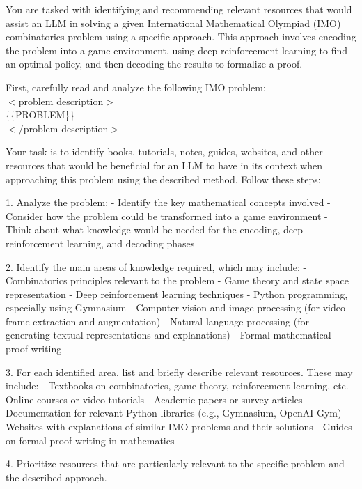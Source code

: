 {\begin{tcolorbox}[enhanced, breakable, rounded corners, 
    colback=brown!5!white, colframe=brown!75!black,
    colbacktitle=brown!85!black, fonttitle=\bfseries, coltitle=white,
    title=Data for In-Context Learning Prompt, width=\columnwidth]

You are tasked with identifying and recommending relevant resources that would assist an LLM in solving a given International Mathematical Olympiad (IMO) combinatorics problem using a specific approach. This approach involves encoding the problem into a game environment, using deep reinforcement learning to find an optimal policy, and then decoding the results to formalize a proof.

First, carefully read and analyze the following IMO problem:\\
$<$problem description$>$\\
\{\{PROBLEM\}\}\\
$<$/problem description$>$

Your task is to identify books, tutorials, notes, guides, websites, and other resources that would be beneficial for an LLM to have in its context when approaching this problem using the described method. Follow these steps:

1. Analyze the problem:
- Identify the key mathematical concepts involved
- Consider how the problem could be transformed into a game environment
- Think about what knowledge would be needed for the encoding, deep reinforcement learning, and decoding phases

2. Identify the main areas of knowledge required, which may include:
- Combinatorics principles relevant to the problem
- Game theory and state space representation
- Deep reinforcement learning techniques
- Python programming, especially using Gymnasium
- Computer vision and image processing (for video frame extraction and augmentation)
- Natural language processing (for generating textual representations and explanations)
- Formal mathematical proof writing

3. For each identified area, list and briefly describe relevant resources. These may include:
- Textbooks on combinatorics, game theory, reinforcement learning, etc.
- Online courses or video tutorials
- Academic papers or survey articles
- Documentation for relevant Python libraries (e.g., Gymnasium, OpenAI Gym)
- Websites with explanations of similar IMO problems and their solutions
- Guides on formal proof writing in mathematics

4. Prioritize resources that are particularly relevant to the specific problem and the described approach.


\end{tcolorbox}}
